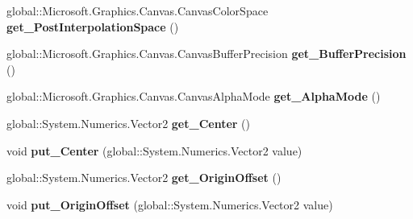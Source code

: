 \begin{DoxyCompactItemize}
global\+::\+Microsoft.\+Graphics.\+Canvas.\+Canvas\+Color\+Space {\bfseries get\+\_\+\+Post\+Interpolation\+Space} ()
\item 
\mbox{\label{interface_microsoft_1_1_graphics_1_1_canvas_1_1_brushes_1_1_i_canvas_radial_gradient_brush_ae9f40c9850f28dbdbdb35e2a96d02bd1}} 
global\+::\+Microsoft.\+Graphics.\+Canvas.\+Canvas\+Buffer\+Precision {\bfseries get\+\_\+\+Buffer\+Precision} ()
\item 
\mbox{\label{interface_microsoft_1_1_graphics_1_1_canvas_1_1_brushes_1_1_i_canvas_radial_gradient_brush_a602ce1fabe87e97329540cbb790009fa}} 
global\+::\+Microsoft.\+Graphics.\+Canvas.\+Canvas\+Alpha\+Mode {\bfseries get\+\_\+\+Alpha\+Mode} ()
\item 
\mbox{\label{interface_microsoft_1_1_graphics_1_1_canvas_1_1_brushes_1_1_i_canvas_radial_gradient_brush_a6d312d2db512b6c12715ccec8cf5cbf1}} 
global\+::\+System.\+Numerics.\+Vector2 {\bfseries get\+\_\+\+Center} ()
\item 
\mbox{\label{interface_microsoft_1_1_graphics_1_1_canvas_1_1_brushes_1_1_i_canvas_radial_gradient_brush_abb05e3ad7b2b918326dc7c9220f7d1e5}} 
void {\bfseries put\+\_\+\+Center} (global\+::\+System.\+Numerics.\+Vector2 value)
\item 
\mbox{\label{interface_microsoft_1_1_graphics_1_1_canvas_1_1_brushes_1_1_i_canvas_radial_gradient_brush_a983923620db82860eb395a57eb158259}} 
global\+::\+System.\+Numerics.\+Vector2 {\bfseries get\+\_\+\+Origin\+Offset} ()
\item 
\mbox{\label{interface_microsoft_1_1_graphics_1_1_canvas_1_1_brushes_1_1_i_canvas_radial_gradient_brush_a0c64a52fe52fb12027fab0f05f036ac3}} 
void {\bfseries put\+\_\+\+Origin\+Offset} (global\+::\+System.\+Numerics.\+Vector2 value)

\end{DoxyCompactItemize}
